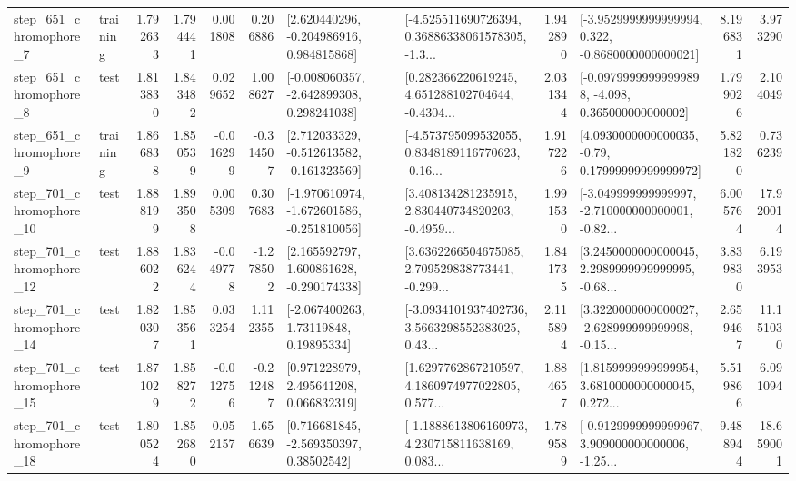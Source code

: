 \begin{tabular}{llrrrrllrlrr}
   step\_651\_chromophore\_7 &  training &      1.792633 &    1.794441 &      0.001808 &  0.206886 &    [2.620440296, -0.204986916, 0.984815868] &  [-4.525511690726394, 0.36886338061578305, -1.3... &       1.942890 &  [-3.9529999999999994, 0.322, -0.8680000000000021] &            8.196831 &          3.973290 \\
   step\_651\_chromophore\_8 &      test &      1.813830 &    1.843482 &      0.029652 &  1.008627 &   [-0.008060357, -2.642899308, 0.298241038] &  [0.282366220619245, 4.651288102704644, -0.4304... &       2.031344 &  [-0.09799999999999898, -4.098, 0.365000000000002] &            1.799026 &          2.104049 \\
   step\_651\_chromophore\_9 &  training &      1.866838 &    1.850539 &     -0.016299 & -0.314507 &   [2.712033329, -0.512613582, -0.161323569] &  [-4.573795099532055, 0.8348189116770623, -0.16... &       1.917226 &   [4.0930000000000035, -0.79, 0.17999999999999972] &            5.821820 &          0.736239 \\
  step\_701\_chromophore\_10 &      test &      1.888199 &    1.893508 &      0.005309 &  0.307683 &  [-1.970610974, -1.672601586, -0.251810056] &  [3.408134281235915, 2.830440734820203, -0.4959... &       1.991530 &  [-3.049999999999997, -2.710000000000001, -0.82... &            6.005764 &         17.920014 \\
  step\_701\_chromophore\_12 &      test &      1.886022 &    1.836244 &     -0.049778 & -1.278502 &    [2.165592797, 1.600861628, -0.290174338] &  [3.6362266504675085, 2.709529838773441, -0.299... &       1.841735 &  [3.2450000000000045, 2.2989999999999995, -0.68... &            3.839830 &          6.193953 \\
  step\_701\_chromophore\_14 &      test &      1.820307 &    1.853561 &      0.033254 &  1.112355 &      [-2.067400263, 1.73119848, 0.19895334] &  [-3.0934101937402736, 3.5663298552383025, 0.43... &       2.115894 &  [3.3220000000000027, -2.628999999999998, -0.15... &            2.659467 &         11.151030 \\
  step\_701\_chromophore\_15 &      test &      1.871029 &    1.858272 &     -0.012756 & -0.212487 &     [0.971228979, 2.495641208, 0.066832319] &  [1.6297762867210597, 4.1860974977022805, 0.577... &       1.884657 &  [1.8159999999999954, 3.6810000000000045, 0.272... &            5.519866 &          6.091094 \\
  step\_701\_chromophore\_18 &      test &      1.800524 &    1.852680 &      0.052157 &  1.656639 &     [0.716681845, -2.569350397, 0.38502542] &  [-1.1888613806160973, 4.230715811638169, 0.083... &       1.789589 &  [-0.9129999999999967, 3.909000000000006, -1.25... &            9.488944 &         18.659001 \\

\end{tabular}
